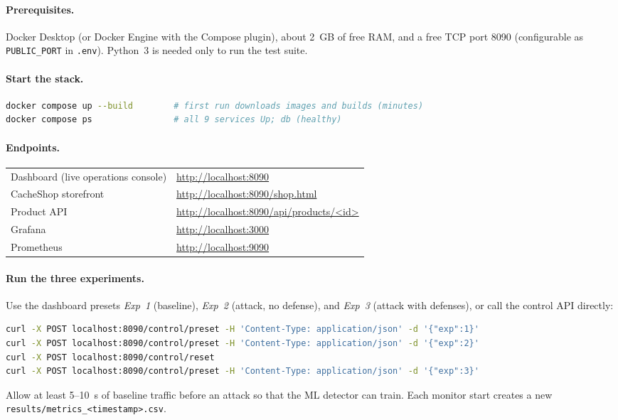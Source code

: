 \documentclass[preprint,12pt]{elsarticle}
\begin{document}
\paragraph{Prerequisites.} Docker Desktop (or Docker Engine with the Compose plugin),
about 2~GB of free RAM, and a free TCP port 8090 (configurable as \texttt{PUBLIC\_PORT}
in \texttt{.env}). Python~3 is needed only to run the test suite.

\paragraph{Start the stack.}
\begin{lstlisting}[language=bash, numbers=none]
docker compose up --build        # first run downloads images and builds (minutes)
docker compose ps                # all 9 services Up; db (healthy)
\end{lstlisting}

\paragraph{Endpoints.}
\begin{center}
\small
\begin{tabular}{@{}ll@{}}
\toprule
Dashboard (live operations console) & \url{http://localhost:8090} \\
CacheShop storefront & \url{http://localhost:8090/shop.html} \\
Product API & \url{http://localhost:8090/api/products/<id>} \\
Grafana & \url{http://localhost:3000} \\
Prometheus & \url{http://localhost:9090} \\
\bottomrule
\end{tabular}
\end{center}

\paragraph{Run the three experiments.} Use the dashboard presets \emph{Exp~1}
(baseline), \emph{Exp~2} (attack, no defense), and \emph{Exp~3} (attack with defenses),
or call the control API directly:
\begin{lstlisting}[language=bash, numbers=none]
curl -X POST localhost:8090/control/preset -H 'Content-Type: application/json' -d '{"exp":1}'
curl -X POST localhost:8090/control/preset -H 'Content-Type: application/json' -d '{"exp":2}'
curl -X POST localhost:8090/control/reset
curl -X POST localhost:8090/control/preset -H 'Content-Type: application/json' -d '{"exp":3}'
\end{lstlisting}
Allow at least 5--10~s of baseline traffic before an attack so that the ML detector can
train. Each monitor start creates a new \texttt{results/metrics\_<timestamp>.csv}.
\end{document}
